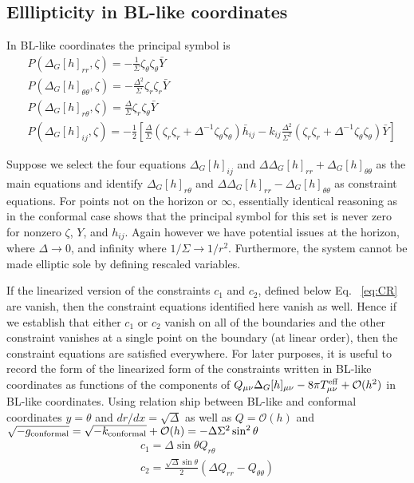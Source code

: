 \documentclass[aps,prd,amsmath,showpacs,amssymb,superscriptaddress,nofootinbib,longbibliography,eqsecnum,preprintnumbers]{revtex4-1}
\begin{document}
\subsection{Elllipticity in BL-like coordinates}

In BL-like coordinates the principal symbol is 
\begin{align}
&P(\Delta_G[h]_{rr},\zeta)=-\frac{1}{\Sigma}\zeta_\theta\zeta_\theta \bar Y \nonumber \\
&P(\Delta_G[h]_{\theta \theta},\zeta)=-\frac{\Delta ^2}{\Sigma} \zeta_r \zeta_r \bar Y \nonumber \\
&P(\Delta_G[h]_{r \theta},\zeta)=\frac{\Delta }{\Sigma} \zeta_r \zeta_\theta \bar Y \nonumber \\
&P(\Delta_G[h]_{ij},\zeta)=-\frac{1}{2}\left[\frac{\Delta}{\Sigma}\left(\zeta_r \zeta_r +\Delta^{-1}\zeta_\theta \zeta_\theta\right)\bar h_{ij}-k_{ij}\frac{\Delta ^2}{\Sigma^2}\left(\zeta_r\zeta_r+\Delta ^{-1}\zeta_\theta \zeta_\theta \right)\bar Y\right]
\end{align}

Suppose we select the four equations $\Delta_G[h]_{ij}$ and $\Delta \Delta_G[h]_{rr}+\Delta_G[h]_{\theta \theta}$ as the main equations and identify $\Delta_G[h]_{r\theta}$ and $\Delta \Delta_G[h]_{rr}-\Delta_G[h]_{\theta\theta}$ as constraint equations. For points not on the horizon or $\infty$, essentially identical reasoning as in the conformal case shows that the principal symbol for this set is never zero for nonzero $\zeta$, $Y$, and $h_{ij}$.
Again however we have potential issues at the horizon, where $\Delta \to 0$, and infinity where $1/\Sigma\to 1/r^2$. Furthermore, the system cannot be made elliptic sole by defining rescaled variables.

If the linearized version of the constraints $c_1$ and $c_2$, defined below Eq.~ \eqref{eq:CR} are vanish, then the constraint equations identified here vanish as well. Hence if we establish that either $c_1$ or $c_2$ vanish on all of the boundaries and the other constraint vanishes at a single point on the boundary (at linear order), then the constraint equations are satisfied everywhere. For later purposes, it is useful to record the form of the linearized form of the constraints written in BL-like coordinates as functions of the components of $Q_{\mu\nu} \Delta_G[h]_{\mu \nu}-8\pi T_{\mu \nu}^{\rm eff}+\mathcal{O}(h^2)$ in BL-like coordinates. Using relation ship between BL-like and conformal coordinates $y=\theta$ and $dr/dx=\sqrt{\Delta}$ as well as $Q=\mathcal{O}(h)$ and $\sqrt{-g_{\rm conformal}}=\sqrt{-k_{\rm conformal}}+\mathcal{O}(h)=-\Delta \Sigma^2 \sin^2\theta$
\begin{align}
c_1= \Delta \sin\theta Q_{r\theta} \nonumber \\
c_2 =\frac{\sqrt{\Delta}\sin\theta}{2}(\Delta Q_{rr}-Q_{\theta\theta})
\end{align}
\end{document}
